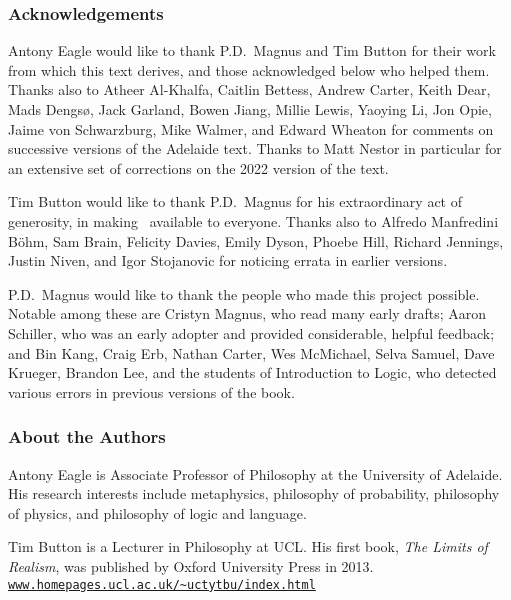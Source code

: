 \thispagestyle{empty}
\onecolumn



\subsubsection*{Acknowledgements}
Antony Eagle would like to thank P.D.\ Magnus and Tim Button for their work from which this text derives, and those acknowledged below who helped them. Thanks also to Atheer Al-Khalfa, Caitlin Bettess, Andrew Carter, Keith Dear, Mads Dengsø, Jack Garland, Bowen Jiang, Millie Lewis, Yaoying Li, Jon Opie, Jaime von Schwarzburg, Mike Walmer, and Edward Wheaton for comments on successive versions of the Adelaide text. Thanks to Matt Nestor in particular for an extensive set of corrections on the 2022 version of the text.\medskip

Tim Button would like to thank P.D.\ Magnus for his extraordinary act of generosity, in making \forallx\ available to everyone. Thanks also to Alfredo Manfredini Böhm, Sam Brain, Felicity Davies, Emily Dyson, Phoebe Hill, Richard Jennings, Justin Niven,  and Igor Stojanovic for noticing errata in earlier versions. \medskip

P.D.\ Magnus would like to thank the people who made this project possible. Notable among these are Cristyn Magnus, who read many early drafts; Aaron Schiller, who was an early adopter and provided considerable, helpful feedback; {and} Bin Kang, Craig Erb, Nathan Carter, Wes McMichael, Selva Samuel,  Dave Krueger, Brandon Lee, and the students of Introduction to Logic, who detected various errors in previous versions of the book. 

\subsubsection*{About the Authors}

Antony Eagle is Associate Professor of Philosophy at the University of Adelaide. His research interests include metaphysics, philosophy of probability, philosophy of physics, and philosophy of logic and language. 
\medskip


Tim Button is a Lecturer in Philosophy at UCL. His first book, \emph{The Limits of Realism}, was published by Oxford University Press in 2013. \href{http://www.homepages.ucl.ac.uk/~uctytbu/index.html}{\nolinkurl{www.homepages.ucl.ac.uk/~uctytbu/index.html}}
\medskip

